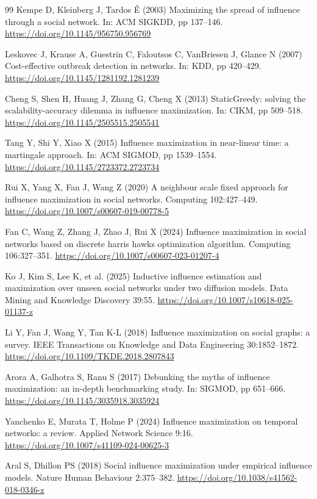 \begin{thebibliography}{99}
 Kempe D, Kleinberg J, Tardos É (2003) Maximizing the spread of influence through a social network. In: ACM SIGKDD, pp 137--146. \url{https://doi.org/10.1145/956750.956769}

 Leskovec J, Krause A, Guestrin C, Faloutsos C, VanBriesen J, Glance N (2007) Cost-effective outbreak detection in networks. In: KDD, pp 420--429. \url{https://doi.org/10.1145/1281192.1281239}

 Cheng S, Shen H, Huang J, Zhang G, Cheng X (2013) StaticGreedy: solving the scalability-accuracy dilemma in influence maximization. In: CIKM, pp 509--518. \url{https://doi.org/10.1145/2505515.2505541}

 Tang Y, Shi Y, Xiao X (2015) Influence maximization in near-linear time: a martingale approach. In: ACM SIGMOD, pp 1539--1554. \url{https://doi.org/10.1145/2723372.2723734}

 Rui X, Yang X, Fan J, Wang Z (2020) A neighbour scale fixed approach for influence maximization in social networks. Computing 102:427--449. \url{https://doi.org/10.1007/s00607-019-00778-5}

 Fan C, Wang Z, Zhang J, Zhao J, Rui X (2024) Influence maximization in social networks based on discrete harris hawks optimization algorithm. Computing 106:327--351. \url{https://doi.org/10.1007/s00607-023-01207-4}

 Ko J, Kim S, Lee K, et al. (2025) Inductive influence estimation and maximization over unseen social networks under two diffusion models. Data Mining and Knowledge Discovery 39:55. \url{https://doi.org/10.1007/s10618-025-01137-z}

 Li Y, Fan J, Wang Y, Tan K-L (2018) Influence maximization on social graphs: a survey. IEEE Transactions on Knowledge and Data Engineering 30:1852--1872. \url{https://doi.org/10.1109/TKDE.2018.2807843}

 Arora A, Galhotra S, Ranu S (2017) Debunking the myths of influence maximization: an in-depth benchmarking study. In: SIGMOD, pp 651--666. \url{https://doi.org/10.1145/3035918.3035924}

 Yanchenko E, Murata T, Holme P (2024) Influence maximization on temporal networks: a review. Applied Network Science 9:16. \url{https://doi.org/10.1007/s41109-024-00625-3}

 Aral S, Dhillon PS (2018) Social influence maximization under empirical influence models. Nature Human Behaviour 2:375--382. \url{https://doi.org/10.1038/s41562-018-0346-z}


\end{thebibliography}
